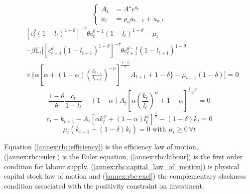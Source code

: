 \documentclass[a4paper,11pt]{amsart}
\begin{document}
\begin{equation}
   \label{annex:rbc:efficiency}
   \begin{cases}
      A_t & = A^{\star}e^{a_t}         \\
      a_t & = \rho_a a_{t-1} + u_{a,t}
   \end{cases}
\end{equation}
\begin{equation}
   \label{annex:rbc:euler}
   \begin{split}
       & \left[c_t^{\theta}(1-l_t)^{1-\theta}\right]^{-\tau}\theta c_t^{\theta-1}(1-l_t)^{1-\theta}-\mu_t                                                                              \\ &-
      \beta \mathbb E_t \Biggl[\left[c_{t+1}^{\theta}(1-l_{t+1})^{1-\theta}\right]^{-\tau}\theta c_{t+1}^{\theta-1}(1-l_{t+1})^{1-\theta}                                              \\
       & \times \Biggl\{\alpha \left[\alpha+(1-\alpha)\left(\frac{k_{t+1}}{l_{t+1}}\right)^{-\psi}\right]^{\frac{1-\psi}{\psi}}A_{t+1}+1-\delta\Biggr\}-\mu_{t+1}(1-\delta)\Biggr] = 0
   \end{split}
\end{equation}
\begin{equation}
   \label{annex:rbc:labour}
   \frac{1-\theta}{ \theta}\frac{c_t}{1-l_t} - (1-\alpha)A_t\left[\alpha \left(\frac{k_t}{l_t}\right)^{\psi}+1-\alpha\right]^{\frac{1-\psi}{\psi}} = 0
\end{equation}
\begin{equation}
   \label{annex:rbc:capital_law_of_motion}
   c_t + k_{t+1} - A_t\left[\alpha k_t^{\psi} + (1-\alpha) l_t^{\psi}\right]^{\frac{1}{\psi}}- (1-\delta)k_t = 0
\end{equation}
\begin{equation}
   \label{annex:rbc:excl}
   \mu_t \left(k_{t+1}-(1-\delta)k_t\right) = 0\text{ with }\mu_t\geq 0 \, \forall t
\end{equation}
\newline

Equation (\ref{annex:rbc:efficiency}) is the efficiency law of
motion, (\ref{annex:rbc:euler}) is the Euler equation,
(\ref{annex:rbc:labour}) is the first order condition for labour
supply, (\ref{annex:rbc:capital_law_of_motion}) is physical capital
stock law of motion and (\ref{annex:rbc:excl}) the complementary slackness condition
associated with the positivity constraint on investment.\newline
\end{document}
